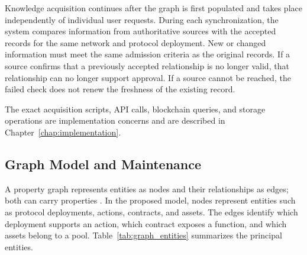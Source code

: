 Knowledge acquisition continues after the graph is first populated and
takes place independently of individual user requests. During each
synchronization, the system compares information from authoritative sources
with the accepted records for the same network and protocol deployment.
New or changed information must meet the same admission criteria as the
original records. If a source confirms that a previously accepted
relationship is no longer valid, that relationship can no longer support
approval. If a source cannot be reached, the failed check does not renew
the freshness of the existing record.


The exact acquisition scripts, API calls, blockchain queries, and storage
operations are implementation concerns and are described in Chapter~\ref{chap:implementation}.

\subsection{Graph Model and Maintenance}
A property graph represents entities as nodes and their relationships as
edges; both can carry properties \cite{angles2018propertygraph}. In the
proposed model, nodes represent entities such as protocol deployments,
actions, contracts, and assets. The edges identify which deployment
supports an action, which contract exposes a function, and which assets
belong to a pool. Table~\ref{tab:graph_entities} summarizes the principal
entities.

